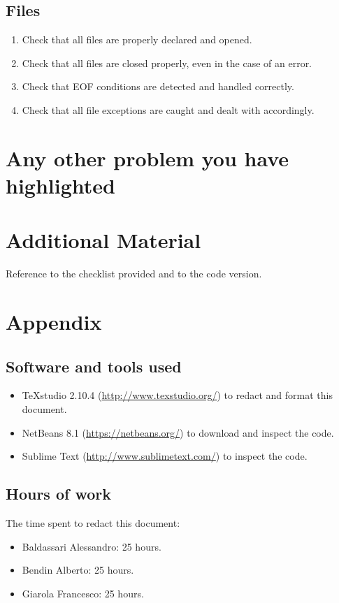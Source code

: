 \documentclass[a4paper,11pt]{report} %
\begin{document}
		\subsection*{Files}\begin{enumerate}[resume]
			\item Check that all files are properly declared and opened.
			\item Check that all files are closed properly, even in the case of an error.
			\item Check that EOF conditions are detected and handled correctly.
			\item Check that all file exceptions are caught and dealt with accordingly.
		\end{enumerate}
		
	
	\section{Any other problem you have highlighted}
	
	\section{Additional Material}
	Reference to the checklist provided and to the code version.
	
	\section{Appendix}
	
	\subsection{Software and tools used}
		\begin{itemize}
			\item TeXstudio 2.10.4 (\href{http://www.texstudio.org/}{http://www.texstudio.org/}) to redact and format this document.
			\item NetBeans 8.1 (\href{https://netbeans.org/}{https://netbeans.org/}) to download and inspect the code.
			\item Sublime Text (\href{http://www.sublimetext.com/}{http://www.sublimetext.com/}) to inspect the code.
		\end{itemize}
		
	\subsection{Hours of work} The time spent to redact this document:
		\begin{itemize}
			\item Baldassari Alessandro: 25 hours.
			\item Bendin Alberto: 25 hours.
			\item Giarola Francesco: 25 hours.
		\end{itemize}
\end{document}
